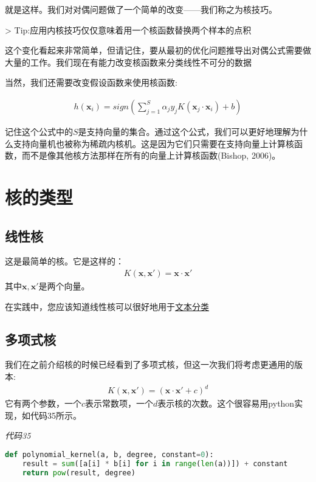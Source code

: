 就是这样。我们对对偶问题做了一个简单的改变——我们称之为核技巧。

> Tip:应用内核技巧仅仅意味着用一个核函数替换两个样本的点积

这个变化看起来非常简单，但请记住，要从最初的优化问题推导出对偶公式需要做大量的工作。我们现在有能力改变核函数来分类线性不可分的数据

当然，我们还需要改变假设函数来使用核函数:

\begin{gather*}
h(\mathbf{x}_i) = sign(\sum_{j=1}^S \alpha_j y_j K(\mathbf{x}_j \cdot \mathbf{x}_i)+b)
\end{gather*}

记住这个公式中的$S$是支持向量的集合。通过这个公式，我们可以更好地理解为什么支持向量机也被称为稀疏内核机。这是因为它们只需要在支持向量上计算核函数，而不是像其他核方法那样在所有的向量上计算核函数(Bishop, 2006)。

\section{核的类型}

\subsection{线性核}
这是最简单的核。它是这样的：
\begin{gather*}
K(\mathbf{x},\mathbf{x}') = \mathbf{x} \cdot \mathbf{x}'
\end{gather*}
其中$\mathbf{x},\mathbf{x}'$是两个向量。

在实践中，您应该知道线性核可以很好地用于\href{http://www.svm-tutorial.com/2014/10/svm-linear-kernel-good-text-classification/}{文本分类}

\subsection{多项式核}
我们在之前介绍核的时候已经看到了多项式核，但这一次我们将考虑更通用的版本:
\begin{gather*}
K(\mathbf{x},\mathbf{x}') = (\mathbf{x} \cdot \mathbf{x}' + c)^d
\end{gather*}
它有两个参数，一个$c$表示常数项，一个$d$表示核的次数。这个很容易用python实现，如代码35所示。

\emph{代码35}

\begin{lstlisting}[language=python]
def polynomial_kernel(a, b, degree, constant=0): 
    result = sum([a[i] * b[i] for i in range(len(a))]) + constant 
    return pow(result, degree)
\end{lstlisting}

